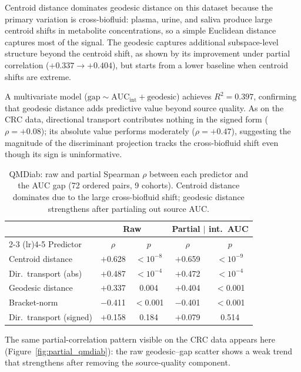 \documentclass{article}
\begin{document}
Centroid distance dominates geodesic distance on this dataset because the primary variation is cross-biofluid: plasma, urine, and saliva produce large centroid shifts in metabolite concentrations, so a simple Euclidean distance captures most of the signal. The geodesic captures additional subspace-level structure beyond the centroid shift, as shown by its improvement under partial correlation ($+0.337 \to +0.404$), but starts from a lower baseline when centroid shifts are extreme.

A multivariate model ($\text{gap} \sim \text{AUC}_{\mathrm{int}} + \text{geodesic}$) achieves $R^2 = 0.397$, confirming that geodesic distance adds predictive value beyond source quality. As on the CRC data, directional transport contributes nothing in the signed form ($\rho = +0.08$); its absolute value performs moderately ($\rho = +0.47$), suggesting the magnitude of the discriminant projection tracks the cross-biofluid shift even though its sign is uninformative.

\begin{table}[t]
\centering
\caption{QMDiab: raw and partial Spearman $\rho$ between each predictor and the AUC gap (72 ordered pairs, 9 cohorts). Centroid distance dominates due to the large cross-biofluid shift; geodesic distance strengthens after partialing out source AUC.}
\label{tab:qmdiab}
\begin{tabular}{lcccc}
\toprule
 & \multicolumn{2}{c}{Raw} & \multicolumn{2}{c}{Partial $|$ int.\ AUC} \\
\cmidrule(lr){2-3} \cmidrule(lr){4-5}
Predictor & $\rho$ & $p$ & $\rho$ & $p$ \\
\midrule
Centroid distance        & $+$0.628 & $<10^{-8}$ & $+$0.659 & $<10^{-9}$ \\
Dir.\ transport (abs)    & $+$0.487 & $<10^{-4}$ & $+$0.472 & $<10^{-4}$ \\
Geodesic distance        & $+$0.337 & 0.004      & $+$0.404 & $<$0.001 \\
Bracket-norm             & $-$0.411 & $<$0.001   & $-$0.401 & $<$0.001 \\
Dir.\ transport (signed) & $+$0.158 & 0.184      & $+$0.079 & 0.514 \\
\bottomrule
\end{tabular}
\end{table}

The same partial-correlation pattern visible on the CRC data appears here (Figure~\ref{fig:partial_qmdiab}): the raw geodesic--gap scatter shows a weak trend that strengthens after removing the source-quality component.
\end{document}
